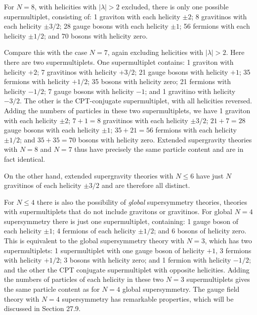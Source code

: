 For $N=8$, with helicities with $|\lambda|>2$ excluded, there is only one
possible supermultiplet, consisting of: 1 graviton with each helicity $\pm2$;
8 gravitinos with each helicity $\pm3/2$; 28 gauge bosons with each helicity
$\pm1$; 56 fermions with each helicity $\pm1/2$; and 70 bosons with helicity
zero.

Compare this with the case $N=7$, again excluding helicities with
$|\lambda|>2$. Here there are two supermultiplets. One supermultiplet
contains: 1 graviton with helicity $+2$; 7 gravitinos with helicity $+3/2$; 21
gauge bosons with helicity $+1$; 35 fermions with helicity $+1/2$; 35 bosons
with helicity zero; 21 fermions with helicity $-1/2$; 7 gauge bosons with
helicity $-1$; and 1 gravitino with helicity $-3/2$. The other is the
CPT-conjugate supermultiplet, with all helicities reversed. Adding the numbers
of particles in these two supermultiplets, we have 1 graviton with each
helicity $\pm2$; $7+1=8$ gravitinos with each helicity $\pm3/2$;
$21+7=28$ gauge bosons with each helicity $\pm1$; $35+21=56$ fermions with
each helicity $\pm1/2$; and $35+35=70$ bosons with helicity zero. Extended
supergravity theories with $N=8$ and $N=7$ thus have precisely the same
particle content and are in fact identical.

On the other hand, extended supergravity theories with $N\leq6$ have just $N$
gravitinos of each helicity $\pm3/2$ and are therefore all distinct.

For $N\leq4$ there is also the possibility of \emph{global} supersymmetry
theories, theories with supermultiplets that do not include gravitons or
gravitinos. For global $N=4$ supersymmetry there is just one supermultiplet,
containing: 1 gauge boson of each helicity $\pm1$; 4 fermions of each helicity
$\pm1/2$; and 6 bosons of helicity zero. This is equivalent to the global
supersymmetry theory with $N=3$, which has two supermultiplets: 1
supermultiplet with one gauge boson of helicity $+1$, 3 fermions with helicity
$+1/2$; 3 bosons with helicity zero; and 1 fermion with helicity $-1/2$; and
the other the CPT conjugate supermultiplet with opposite helicities. Adding
the numbers of particles of each helicity in these two $N=3$ supermultiplets
gives the same particle content as for $N=4$ global supersymmetry. The gauge
field theory with $N=4$ supersymmetry has remarkable properties, which will
be discussed in Section 27.9.

